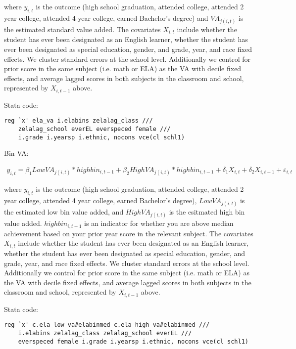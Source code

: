 \documentclass[letterpaper,12pt]{article}
\begin{document}
\noindent where $y_{i, t}$ is the outcome (high school graduation, attended college, attended 2 year college, attended 4 year college, earned Bachelor's degree) and $VA_{j(i, t)}$ is the estimated standard value added. The covariates $X_{i, t}$ include whether the student has ever been designated as an English learner, whether the student has ever been designated as special education, gender, and grade, year, and race fixed effects. We cluster standard errors at the school level. Additionally we control for prior score in the same subject (i.e. math or ELA) as the VA with decile fixed effects, and average lagged scores in both subjects in the classroom and school, represented by $X_{i, t-1}$ above.

\vspace{.5cm}

\noindent Stata code:

\begin{verbatim}
reg `x' ela_va i.elabins zelalag_class ///
    zelalag_school everEL everspeced female ///
    i.grade i.yearsp i.ethnic, nocons vce(cl schl1)
\end{verbatim}

\vspace{.5cm}

\noindent Bin VA:

    \begin{align*}
        y_{i, t} = \beta_1 LowVA_{j(i, t)}*highbin_{i,t-1} + \beta_2 HighVA_{j(i, t)}*highbin_{i,t-1} + \delta_1 X_{i, t} + \delta_2 X_{i, t-1} + \varepsilon_{i, t}
    \end{align*}

\noindent where $y_{i, t}$ is the outcome (high school graduation, attended college, attended 2 year college, attended 4 year college, earned Bachelor's degree), $LowVA_{j(i, t)}$ is the estimated low bin value added, and $HighVA_{j(i, t)}$ is the esitmated high bin value added. $highbin_{i,t-1}$ is an indicator for whether you are above median achievement based on your prior year score in the relevant subject. The covariates $X_{i, t}$ include whether the student has ever been designated as an English learner, whether the student has ever been designated as special education, gender, and grade, year, and race fixed effects. We cluster standard errors at the school level. Additionally we control for prior score in the same subject (i.e. math or ELA) as the VA with decile fixed effects, and average lagged scores in both subjects in the classroom and school, represented by $X_{i, t-1}$ above.

\vspace{.5cm}

\noindent Stata code:

\begin{verbatim}
reg `x' c.ela_low_va#elabinmed c.ela_high_va#elabinmed /// 
    i.elabins zelalag_class zelalag_school everEL ///
    everspeced female i.grade i.yearsp i.ethnic, nocons vce(cl schl1)
\end{verbatim}
\end{document}
